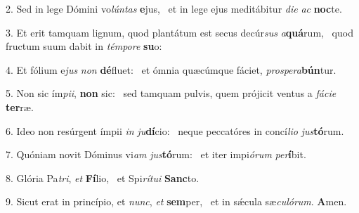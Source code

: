 2. Sed in lege Dómini vo\textit{lún}\textit{tas} \textbf{e}jus, \ast\  et in lege ejus meditábitur \textit{di}\textit{e} \textit{ac} \textbf{noc}te.\

3. Et erit tamquam lignum, quod plantátum est secus decúr\textit{sus} \textit{a}\textbf{quá}rum, \ast\  quod fructum suum dabit in \textit{tém}\textit{po}\textit{re} \textbf{su}o:\

4. Et fólium e\textit{jus} \textit{non} \textbf{dé}fluet: \ast\  et ómnia quæcúmque fáciet, \textit{pro}\textit{spe}\textit{ra}\textbf{bún}tur.\

5. Non sic ím\textit{pi}\textit{i}, \textbf{non} sic: \ast\  sed tamquam pulvis, quem prójicit ventus a \textit{fá}\textit{ci}\textit{e} \textbf{ter}ræ.\

6. Ideo non resúrgent ímpii \textit{in} \textit{ju}\textbf{dí}cio: \ast\  neque peccatóres in concí\textit{li}\textit{o} \textit{jus}\textbf{tó}rum.\

7. Quóniam novit Dóminus vi\textit{am} \textit{jus}\textbf{tó}rum: \ast\  et iter impi\textit{ó}\textit{rum} \textit{per}\textbf{í}bit.\

8. Glória Pa\textit{tri}, \textit{et} \textbf{Fí}lio, \ast\  et Spi\textit{rí}\textit{tu}\textit{i} \textbf{Sanc}to.\

9. Sicut erat in princípio, et \textit{nunc}, \textit{et} \textbf{sem}per, \ast\  et in sǽcula sæ\textit{cu}\textit{ló}\textit{rum}. \textbf{A}men.\

